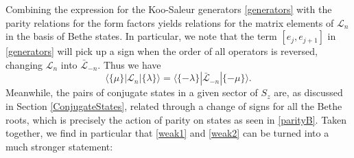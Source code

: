 \documentclass[a4paper,10pt]{article}
\newcommand{\linnea}[1]{$\framebox{\tiny L}$\ \textbf{\texttt{{\color{red}\footnotesize#1}}}}
\newcommand{\jesper}[1]{$\framebox{\tiny J}$\ \textbf{\texttt{{\color{cyan}\footnotesize#1}}}}
\newcommand{\KSgen}{\mathcal{L}}
\begin{document}






Combining the expression for the Koo-Saleur generators \eqref{generators} with the parity relations for the form factors yields relations for the matrix elements of $\KSgen_n$ in the basis of Bethe states. In particular, we note that the term $[e_j,e_{j+1}]$ in \eqref{generators} will pick up a sign when the order of all operators is reversed, changing $\KSgen_n$ into $\bar{\KSgen}_{-n}$. Thus we have
%
\begin{equation}\label{parity_duality}
\langle \{\mu\} | \KSgen_n | \{\lambda\} \rangle = \langle \{-\lambda\} | \bar{\KSgen}_{-n} | \{-\mu\} \rangle.
\end{equation}
%
Meanwhile, the pairs of conjugate states in a given sector of $S_z$ are, as discussed in Section \ref{ConjugateStates}, related through a change of signs for all the Bethe roots, which is precisely the action of parity on states as seen in \eqref{parityB}. Taken together, we find in particular that \eqref{weak1} and \eqref{weak2} can be turned into a much stronger statement:
\end{document}
